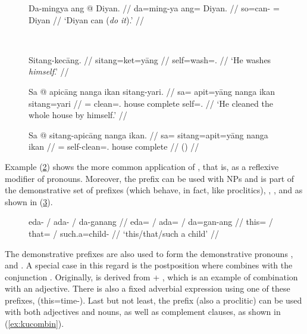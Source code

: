 \begin{figure}
\begin{minipage}[t]{.5\linewidth}
\ex\label{ex:davb}
\begingl
	\gla Da-mingya ang @ Diyan. //
	\glb da=ming-ya ang= Diyan. //
	\glc so=can-\TsgM{} \Aarg{}= Diyan //
	\glft `Diyan can (\emph{do it}).' //
\endgl
\xe
\end{minipage}
~
\begin{minipage}[t]{.5\linewidth} 
\ex\label{ex:sitangvb}
\begingl
	\gla Sitang-kecāng. //
	\glb sitang=ket=yāng //
	\glc self=wash=\TsgM{}.\Aarg{} //
	\glft `He washes \emph{himself}.' //
\endgl\xe
\end{minipage}
\end{figure}

\begin{figure}
\pex\label{ex:sitangpronvb}
\a\label{ex:sitang+pronoun}\begingl
	\gla Sa @ apicāng nanga ikan sitang-yari. //
	\glb sa= apit=yāng nanga ikan sitang=yari //
	\glc \PatT{}= clean=\Tsg{}.\Aarg{} house complete 
		self=\TsgM{}.\Ins{} //
	\glft `He cleaned the whole house by himself.' //
\endgl

\a\begingl
	\gla Sa @ sitang-apicāng nanga ikan. //
	\glb sa= sitang=apit=yāng nanga ikan //
	\glc \PatT{}= self-clean=\Tsg{}.\Aarg{} house complete //
	\glft () //
\endgl
\xe
\end{figure}

\label{nounprefixes}
Example (\ref{ex:sitang+pronoun}) shows the more common application of 
, that is, as a reflexive modifier of pronouns. Moreover,
the prefix  can be used with NPs and is part of
the demonstrative set of prefixes (which behave, in fact, like proclitics),
, , and  as shown in (\ref{ex:dempfxs}).

\begin{figure}
\ex\label{ex:dempfxs}\begingl
	\gla eda- / ada- / da-ganang //
	\glb eda= / ada= / da=gan-ang //
	\glc this= / that= / such.a=child-\Aarg{} //
	\glft `this/that/such a child' //
\endgl\xe
\end{figure}

The demonstrative prefixes are also used to form the demonstrative 
pronouns , 
 and . A special case
in this regard is the postposition  where  combines with the conjunction
. Originally, 
 is derived from  + 
, which is an example of combination 
with an adjective. There is also a fixed adverbial expression using one of
these prefixes, 
(this=time-\Dat{}). Last but not least, the prefix  (also a proclitic) can be used with both adjectives and nouns, as well
as complement clauses, as shown in (\ref{ex:kucombin}).

